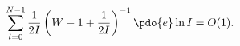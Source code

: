 \begin{equation}
\label{Eq_A44}
\sum^{N-1}_{l=0} \frac{1}{2I} \left( W - 1 + \frac{1}{2I} \right)^{-1}
  \pdo{e} \ln I = O(1).
\end{equation}

